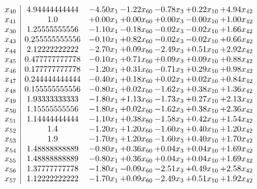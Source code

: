 \documentclass[8pt]{article}
\begin{document}
\[\begin{array}{c| c c@{\hskip 2pt} c@{\hskip 2pt} c@{\hskip 2pt} c@{\hskip 2pt} c@{\hskip 2pt} }
 x_{40}   &  4.94444444444 & -4.50 x_{1} & -1.22 x_{60} & -0.78 x_{3} & +  0.22 x_{10} & +  4.94 x_{42}\\
 x_{41}   &  1.0 & +  0.00 x_{1} & +  0.00 x_{60} & +  0.00 x_{3} & -0.00 x_{10} & +  1.00 x_{42}\\
 x_{30}   &  1.25555555556 & -1.10 x_{1} & -0.18 x_{60} & -0.02 x_{3} & -0.02 x_{10} & +  1.66 x_{42}\\
 x_{43}   &  0.255555555556 & -0.10 x_{1} & +  0.82 x_{60} & -0.02 x_{3} & -0.02 x_{10} & +  0.66 x_{42}\\
 x_{44}   &  2.12222222222 & -2.70 x_{1} & +  0.09 x_{60} & -2.49 x_{3} & +  0.51 x_{10} & +  2.92 x_{42}\\
 x_{45}   &  0.477777777778 & -0.10 x_{1} & +  0.71 x_{60} & +  0.09 x_{3} & +  0.09 x_{10} & +  0.88 x_{42}\\
 x_{46}   &  0.177777777778 & -1.20 x_{1} & +  0.31 x_{60} & -0.71 x_{3} & +  0.29 x_{10} & +  0.98 x_{42}\\
 x_{47}   &  0.244444444444 & -0.40 x_{1} & +  0.18 x_{60} & +  0.02 x_{3} & +  0.02 x_{10} & +  0.84 x_{42}\\
 x_{48}   &  0.155555555556 & -0.80 x_{1} & +  0.02 x_{60} & -1.62 x_{3} & +  0.38 x_{10} & +  1.36 x_{42}\\
 x_{49}   &  1.93333333333 & -1.80 x_{1} & +  1.13 x_{60} & -1.73 x_{3} & +  0.27 x_{10} & +  2.13 x_{42}\\
 x_{50}   &  1.15555555556 & -1.80 x_{1} & +  0.02 x_{60} & -1.62 x_{3} & +  0.38 x_{10} & +  2.36 x_{42}\\
 x_{51}   &  1.14444444444 & -1.10 x_{1} & +  0.38 x_{60} & -1.58 x_{3} & +  0.42 x_{10} & +  1.54 x_{42}\\
 x_{52}   &  1.4 & -1.20 x_{1} & +  1.20 x_{60} & -1.60 x_{3} & +  0.40 x_{10} & +  1.20 x_{42}\\
 x_{53}   &  1.9 & -1.70 x_{1} & +  1.20 x_{60} & -1.60 x_{3} & +  0.40 x_{10} & +  1.70 x_{42}\\
 x_{54}   &  1.48888888889 & -0.80 x_{1} & +  0.36 x_{60} & +  0.04 x_{3} & +  0.04 x_{10} & +  1.69 x_{42}\\
 x_{55}   &  1.48888888889 & -0.80 x_{1} & +  0.36 x_{60} & +  0.04 x_{3} & +  0.04 x_{10} & +  1.69 x_{42}\\
 x_{56}   &  1.37777777778 & -1.80 x_{1} & -0.09 x_{60} & -2.51 x_{3} & +  0.49 x_{10} & +  2.58 x_{42}\\
 x_{57}   &  1.12222222222 & -1.70 x_{1} & +  0.09 x_{60} & -2.49 x_{3} & +  0.51 x_{10} & +  1.92 x_{42}\\

\end{array}\]
\end{document}
